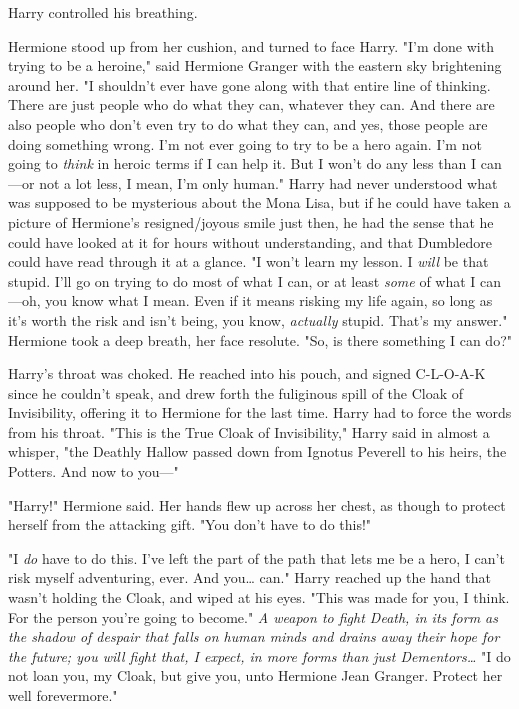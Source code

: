 Harry controlled his breathing.

Hermione stood up from her cushion, and turned to face Harry. "I'm done with
trying to be a heroine," said Hermione Granger with the eastern sky brightening
around her. "I shouldn't ever have gone along with that entire line of
thinking. There are just people who do what they can, whatever they can. And
there are also people who don't even try to do what they can, and yes, those
people are doing something wrong. I'm not ever going to try to be a hero again.
I'm not going to \emph{think} in heroic terms if I can help it. But I won't do
any less than I can---or not a lot less, I mean, I'm only human." Harry had
never understood what was supposed to be mysterious about the Mona Lisa, but if
he could have taken a picture of Hermione's resigned/joyous smile just then, he
had the sense that he could have looked at it for hours without understanding,
and that Dumbledore could have read through it at a glance. "I won't learn my
lesson. I \emph{will} be that stupid. I'll go on trying to do most of what I
can, or at least \emph{some} of what I can---oh, you know what I mean. Even if
it means risking my life again, so long as it's worth the risk and isn't being,
you know, \emph{actually} stupid. That's my answer." Hermione took a deep
breath, her face resolute. "So, is there something I can do?"

Harry's throat was choked. He reached into his pouch, and signed C-L-O-A-K
since he couldn't speak, and drew forth the fuliginous spill of the Cloak of
Invisibility, offering it to Hermione for the last time. Harry had to force the
words from his throat. "This is the True Cloak of Invisibility," Harry said in
almost a whisper, "the Deathly Hallow passed down from Ignotus Peverell to his
heirs, the Potters. And now to you---"

"Harry!" Hermione said. Her hands flew up across her chest, as though to
protect herself from the attacking gift. "You don't have to do this!"

"I \emph{do} have to do this. I've left the part of the path that lets me be a
hero, I can't risk myself adventuring, ever. And you{\ldots} can." Harry
reached up the hand that wasn't holding the Cloak, and wiped at his eyes. "This
was made for you, I think. For the person you're going to become." \emph{A
weapon to fight Death, in its form as the shadow of despair that falls on human
minds and drains away their hope for the future; you will fight that, I expect,
in more forms than just Dementors{\ldots}} "I do not loan you, my Cloak, but
give you, unto Hermione Jean Granger. Protect her well forevermore."

